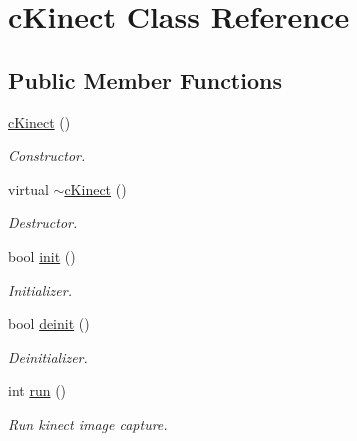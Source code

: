 \hypertarget{classc_kinect}{}\section{c\+Kinect Class Reference}
\label{classc_kinect}
\subsection*{Public Member Functions}
\begin{DoxyCompactItemize}
\item 
\mbox{\label{classc_kinect_a379d120a01f59bda211c3b1d88df714a}} 
\mbox{\hyperlink{classc_kinect_a379d120a01f59bda211c3b1d88df714a}{c\+Kinect}} ()
\begin{DoxyCompactList}\small\item\em Constructor. \end{DoxyCompactList}\item 
\mbox{\label{classc_kinect_a40fcf0437aec686fcaeea2b67db7af45}} 
virtual \mbox{\hyperlink{classc_kinect_a40fcf0437aec686fcaeea2b67db7af45}{$\sim$c\+Kinect}} ()
\begin{DoxyCompactList}\small\item\em Destructor. \end{DoxyCompactList}\item 
\mbox{\label{classc_kinect_acd84d6e2aba6b98beb76cdb36e01f4a6}} 
bool \mbox{\hyperlink{classc_kinect_acd84d6e2aba6b98beb76cdb36e01f4a6}{init}} ()
\begin{DoxyCompactList}\small\item\em Initializer. \end{DoxyCompactList}\item 
\mbox{\label{classc_kinect_aa718243c8ad9409ce249b61fd92b98fd}} 
bool \mbox{\hyperlink{classc_kinect_aa718243c8ad9409ce249b61fd92b98fd}{deinit}} ()
\begin{DoxyCompactList}\small\item\em Deinitializer. \end{DoxyCompactList}\item 
\mbox{\label{classc_kinect_ad496f08195abea945842d94256f5809b}} 
int \mbox{\hyperlink{classc_kinect_ad496f08195abea945842d94256f5809b}{run}} ()
\begin{DoxyCompactList}\small\item\em Run kinect image capture. \end{DoxyCompactList}\item 

\end{DoxyCompactItemize}
